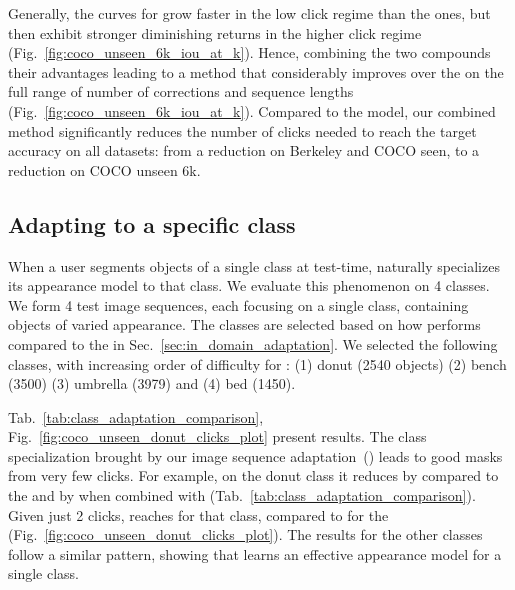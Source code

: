 Generally, the curves for \datasetSGD{} grow faster in the low click regime than the \imageSGD{} ones, but then exhibit stronger diminishing returns in the higher click regime (Fig.~\ref{fig:coco_unseen_6k_iou_at_k}).
Hence, combining the two compounds their advantages
leading to a method that considerably improves over the \fixedmodellong{} on the full range of number of corrections and sequence lengths (Fig.~\ref{fig:coco_unseen_6k_iou_at_k}).
Compared to the \fixedmodel{} model, our combined method significantly reduces the number of clicks needed to reach the target accuracy on all datasets: from a  reduction on Berkeley and COCO seen, to a  reduction on COCO unseen 6k.

\subsection{Adapting to a specific class}
\label{sec:class_adaptation}
When a user segments objects of a single class at test-time, \datasetSGD{} naturally specializes its appearance model to that class.
We evaluate this phenomenon on 4 \coco{} classes.
We form 4 test image sequences, each focusing on a single class, containing objects of varied appearance. The classes are selected based on how \datasetSGD{} performs compared to the \fixedmodellong{} in Sec.~\ref{sec:in_domain_adaptation}.
We selected the following classes, with increasing order of difficulty for \datasetSGD{}:
(1) donut (2540 objects)
(2) bench (3500)
(3) umbrella (3979)
and (4) bed (1450). 

Tab.~\ref{tab:class_adaptation_comparison}, Fig.~\ref{fig:coco_unseen_donut_clicks_plot}  present results.
The class specialization brought by our image sequence adaptation~(\sequenceadaptationshort{}) leads to good masks from very few clicks.
For example, on the donut class it reduces  by  compared to the \fixedmodellong{} and by  when combined with \imageSGD{} (Tab.~\ref{tab:class_adaptation_comparison}).
Given just 2 clicks, \sequenceadaptationshort{} reaches  \iou{} for that class, compared to  \iou{} for the \fixedmodellong{} (Fig.~\ref{fig:coco_unseen_donut_clicks_plot}). The results for the other classes follow a similar pattern,
showing that \datasetSGD{} learns an effective appearance model for a single class.

